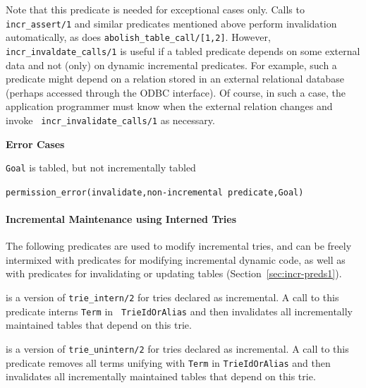 \begin{description}
Note that this predicate is needed for exceptional cases only.  Calls
to {\tt incr\_assert/1} and similar predicates mentioned above perform
invalidation automatically, as does {\tt abolish\_table\_call/[1,2]}.
However, {\tt incr\_invaldate\_calls/1} is useful if a tabled
predicate depends on some external data and not (only) on dynamic
incremental predicates.  For example, such a predicate might depend on
a relation stored in an external relational database (perhaps accessed
through the ODBC interface).
Of course, in such a case, the application programmer must know when
the external relation changes and invoke {\tt
  incr\_invalidate\_calls/1} as necessary.


{\bf Error Cases}
\bi
\item 	{\tt Goal} is tabled, but not incrementally tabled
\bi
\item 	{\tt permission\_error(invalidate,non-incremental predicate,Goal)}
\ei
\ei

\end{description}

\paragraph{Incremental Maintenance using Interned Tries}
The following predicates are used to modify incremental tries, and can
be freely intermixed with predicates for modifying incremental dynamic
code, as well as with predicates for invalidating or updating tables
(Section~\ref{sec:incr-preds1}).

\begin{description}
%
is a version of {\tt trie\_intern/2} for tries declared as
incremental.  A call to this predicate interns {\tt Term} in {\tt
  TrieIdOrAlias} and then invalidates all incrementally maintained
tables that depend on this trie.

%
is a version of {\tt trie\_unintern/2} for tries declared as
incremental.  A call to this predicate removes all terms unifying with
{\tt Term} in {\tt TrieIdOrAlias} and then invalidates all
incrementally maintained tables that depend on this trie.


%
\end{description}


